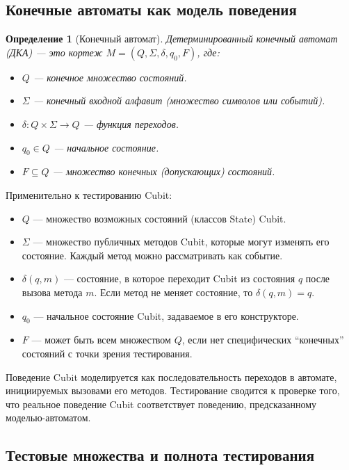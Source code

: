 \documentclass[14pt, russian]{scrartcl}
\newcommand{\enq}[1]{\enquote{#1}}
\newcounter{cDefinition}
\newtheorem{Definition}{Определение}[cDefinition]
\begin{document}
\subsection{Конечные автоматы как модель поведения}

\begin{Definition}[Конечный автомат]
Детерминированный конечный автомат (ДКА) — это кортеж $M = (Q, \Sigma, \delta, q_0, F)$, где:
\begin{itemize}
    \item $Q$ — конечное множество состояний.
    \item $\Sigma$ — конечный входной алфавит (множество символов или событий).
    \item $\delta: Q \times \Sigma \rightarrow Q$ — функция переходов.
    \item $q_0 \in Q$ — начальное состояние.
    \item $F \subseteq Q$ — множество конечных (допускающих) состояний.
\end{itemize}
\end{Definition}

Применительно к тестированию Cubit:
\begin{itemize}
    \item $Q$ — множество возможных состояний (классов State) Cubit.
    \item $\Sigma$ — множество публичных методов Cubit, которые могут изменять его состояние. Каждый метод можно рассматривать как событие.
    \item $\delta(q, m)$ — состояние, в которое переходит Cubit из состояния $q$ после вызова метода $m$. Если метод не меняет состояние, то $\delta(q, m) = q$.
    \item $q_0$ — начальное состояние Cubit, задаваемое в его конструкторе.
    \item $F$ — может быть всем множеством $Q$, если нет специфических \enq{конечных} состояний с точки зрения тестирования.
\end{itemize}

Поведение Cubit моделируется как последовательность переходов в автомате, инициируемых вызовами его методов. Тестирование сводится к проверке того, что реальное поведение Cubit соответствует поведению, предсказанному моделью-автоматом.

\subsection{Тестовые множества и полнота тестирования}
\end{document}

